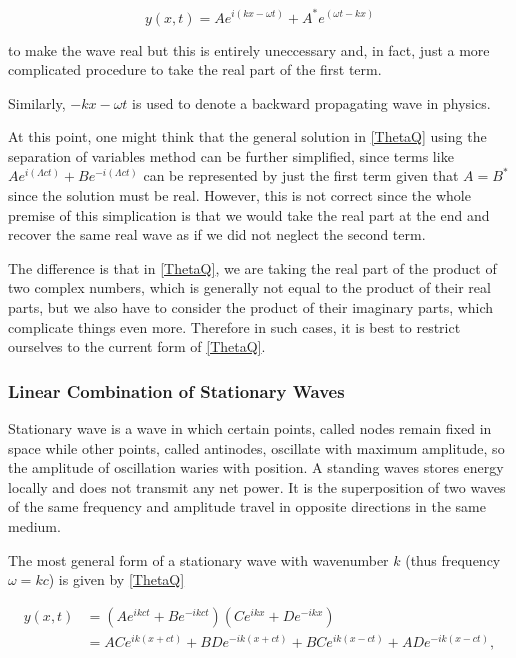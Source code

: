 \documentclass[a4paper,12pt]{report}
\begin{document}
\begin{equation}
	y(x,t) = Ae^{i(kx-\omega t)} + A^*e^{(\omega t-kx)} 
\end{equation}

to make the wave real but this is entirely uneccessary and, in fact, just a more complicated procedure to take the real part of the first term.

Similarly, \(-kx-\omega t\) is used to denote a backward propagating wave in physics.

At this point, one might think that the general solution in \cref{ThetaQ} using the separation of variables method can be further simplified, since terms like \(Ae^{i(\Lambda ct)}+Be^{-i(\Lambda ct)}  \) can be represented by just the first term given that \(A = B^*\) since the solution must be real. However, this is not correct since the whole premise of this simplication is that we would take the real part at the end and recover the same real wave as if we did not neglect the second term.

The difference is that in \cref{ThetaQ}, we are taking the real part of the product of two complex numbers, which is generally not equal to the product of their real parts, but we also have to consider the product of their imaginary parts, which complicate things even more. Therefore in such cases, it is best to restrict ourselves to the current form of \cref{ThetaQ}.


\subsubsection{Linear Combination of Stationary Waves}

Stationary wave is a wave in which certain points, called nodes remain fixed in space while other points, called antinodes, oscillate with maximum amplitude, so the amplitude of oscillation waries with position. A standing waves stores energy locally and does not transmit any net power. It is the superposition of two waves of the same frequency and amplitude travel in opposite directions in the same medium.

The most general form of a stationary wave with wavenumber \(k\) (thus frequency \(\omega = kc\)) is given by \cref{ThetaQ} 

\begin{equation}
	\begin{aligned} 
	y(x,t) &= \left( Ae^{ik ct}+Be^{-ik ct}    \right)\left( Ce^{i k x}+De^{-i k x}   \right) \\
	&=AC e^{ik(x+ct)} + BD e^{-ik(x+ct)} + BC e^{ik(x-ct)} + AD e^{-ik(x-ct)},
	\end{aligned} 
\end{equation}
\end{document}
